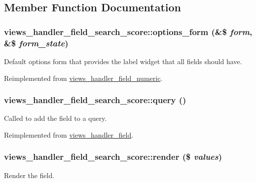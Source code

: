 \subsection{Member Function Documentation}
\hypertarget{classviews__handler__field__search__score_ad3bc7dfcc4859869b75b371c33380abb}{
\subsubsection[{options\_\-form}]{\setlength{\rightskip}{0pt plus 5cm}views\_\-handler\_\-field\_\-search\_\-score::options\_\-form (\&\$ {\em form}, \/  \&\$ {\em form\_\-state})}}
\label{classviews__handler__field__search__score_ad3bc7dfcc4859869b75b371c33380abb}
Default options form that provides the label widget that all fields should have. 

Reimplemented from \hyperlink{classviews__handler__field__numeric_ae6f81d1896ece64e9450ebc2d60da2fd}{views\_\-handler\_\-field\_\-numeric}.\hypertarget{classviews__handler__field__search__score_afda75fb726345ee91401d2f79ad2d313}{
\subsubsection[{query}]{\setlength{\rightskip}{0pt plus 5cm}views\_\-handler\_\-field\_\-search\_\-score::query ()}}
\label{classviews__handler__field__search__score_afda75fb726345ee91401d2f79ad2d313}
Called to add the field to a query. 

Reimplemented from \hyperlink{classviews__handler__field_a4f661f91bcbe80d4a00c30a31456c502}{views\_\-handler\_\-field}.\hypertarget{classviews__handler__field__search__score_a80a58d69b8a6c7f57da022e88f90e32d}{
\subsubsection[{render}]{\setlength{\rightskip}{0pt plus 5cm}views\_\-handler\_\-field\_\-search\_\-score::render (\$ {\em values})}}
\label{classviews__handler__field__search__score_a80a58d69b8a6c7f57da022e88f90e32d}
Render the field.


